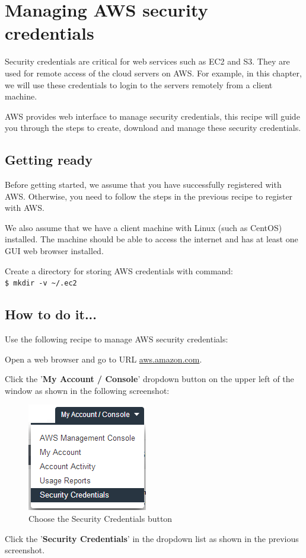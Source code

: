 \section{Managing AWS security credentials}
Security credentials are critical for web services such as EC2 and S3. They are used for remote access of the cloud servers on AWS. For example, in this chapter, we will use these credentials to login to the servers remotely from a client machine.

AWS provides web interface to manage security credentials, this recipe will guide you through the steps to create, download and manage these security credentials.
\subsection*{Getting ready}
Before getting started, we assume that you have successfully registered with AWS. Otherwise, you need to follow the steps in the previous recipe to register with AWS.

We also assume that we have a client machine with Linux (such as CentOS) installed. The machine should be able to access the internet and has at least one GUI web browser installed.

Create a directory for storing AWS credentials with command: \\
\verb|$ mkdir -v ~/.ec2|
\subsection*{How to do it...}
Use the following recipe to manage AWS security credentials:

Open a web browser and go to URL \url{aws.amazon.com}.

Click the '\textbf{My Account / Console}' dropdown button on the upper left of the window as shown in the following screenshot:
\begin{figure}[ht]
  \centering
  \includegraphics[width=.45\textwidth]{figs/5163os_08_07.png}
  \caption{Choose the Security Credentials button}\label{fig:secu.select}
\end{figure} 
Click the '\textbf{Security Credentials}' in the dropdown list as shown in the previous screenshot.

